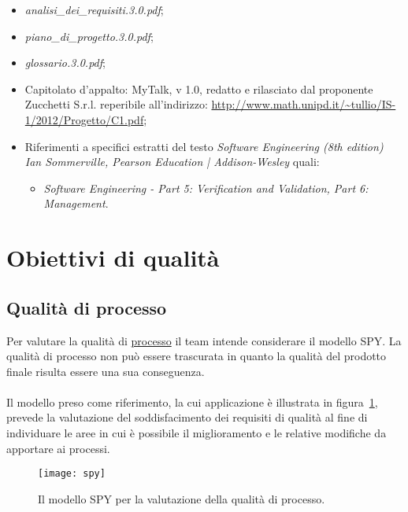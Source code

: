 \begin{itemize}
\item[] \textit{analisi\_dei\_requisiti.3.0.pdf};
\item[] \textit{piano\_di\_progetto.3.0.pdf};
\item[] \textit{glossario.3.0.pdf};
\item[] Capitolato d'appalto: MyTalk, v 1.0, redatto e rilasciato dal proponente Zucchetti S.r.l. reperibile all'indirizzo: \url{http://www.math.unipd.it/~tullio/IS-1/2012/Progetto/C1.pdf};

\item[] Riferimenti a specifici estratti del testo \textit{Software Engineering (8th edition) Ian Sommerville, Pearson Education | Addison-Wesley} quali:
\begin{itemize}
  \item[] \textit{Software Engineering - Part 5: Verification and Validation, Part 6: Management}.\\
\end{itemize}
\end{itemize}
\clearpage

\section{Obiettivi di qualità}

\subsection{Qualità di processo}
Per valutare la qualità di \underline{processo} il team intende considerare il modello SPY. La qualità di processo non può essere trascurata in quanto la qualità del prodotto finale risulta essere una sua conseguenza.\\\\
Il modello preso come riferimento, la cui applicazione è illustrata in figura~\ref{fig:spy}, prevede la valutazione del soddisfacimento dei requisiti di qualità al fine di individuare le aree in cui è possibile il miglioramento e le relative modifiche da apportare ai processi.
 
\begin{figure}[h]
\centering
\texttt{[image: spy]}
\caption{Il modello SPY per la valutazione della qualità di processo.}\label{fig:spy}
\end{figure}

